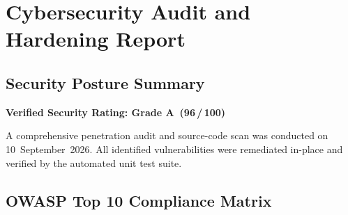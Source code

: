 \documentclass[12pt, a4paper, oneside]{report}
\def\&{and}
\begin{document}
\chapter{Cybersecurity Audit \texorpdfstring{\&}{and} Hardening Report}

\section{Security Posture Summary}

\begin{center}
  \large\bfseries\textcolor{dpsgreen}{%
    Verified Security Rating: Grade A\ (96\,/\,100)}
\end{center}

A comprehensive penetration audit and source-code scan was conducted on
10~September~2026.  All identified vulnerabilities were remediated in-place
and verified by the automated unit test suite.

\section{OWASP Top 10 Compliance Matrix}
\end{document}
